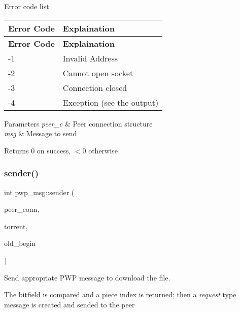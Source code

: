 Error code list

\tabulinesep=1mm
\begin{longtabu} spread 0pt [c]{*{2}{|X[-1]}|}
\hline
\rowcolor{\tableheadbgcolor}\textbf{ Error Code }&\textbf{ Explaination  }\\
\endfirsthead
\hline
\endfoot
\hline
\rowcolor{\tableheadbgcolor}\textbf{ Error Code }&\textbf{ Explaination  }\\
\endhead
-\/1 &Invalid Address \\
-\/2 &Cannot open socket \\
-\/3 &Connection closed \\
-\/4 &Exception (see the output) \\
\end{longtabu}

\begin{DoxyParams}{Parameters}
{\em peer\+\_\+c} & Peer connection structure \\
\hline
{\em msg} & Message to send \\
\hline
\end{DoxyParams}
\begin{DoxyReturn}{Returns}
0 on success, $<$0 otherwise 
\end{DoxyReturn}
\mbox{\label{namespacepwp__msg_ab578b213d293636d33efc24382f16b25}} 
\subsubsection{\texorpdfstring{sender()}{sender()}}
{\footnotesize\ttfamily int pwp\+\_\+msg\+::sender (\begin{DoxyParamCaption}\item[{\hyperlink{structpwp_1_1peer__connection}{pwp\+::peer\+\_\+connection} \&}]{peer\+\_\+conn,  }\item[{\hyperlink{structtorr_1_1Torrent}{Torrent} \&}]{torrent,  }\item[{int \&}]{old\+\_\+begin }\end{DoxyParamCaption})}



Send appropriate P\+WP message to download the file. 

The bitfield is compared and a piece index is returned; then a {\itshape request} type message is created and sended to the peer


